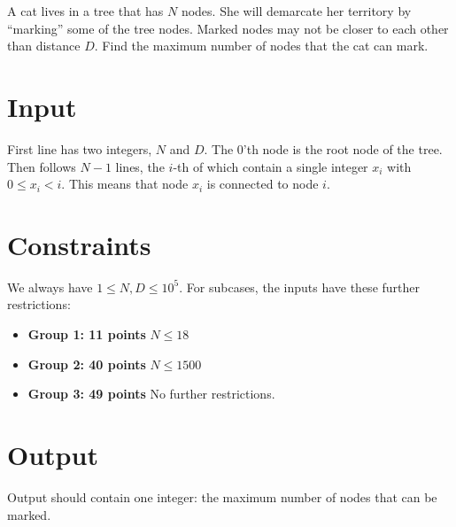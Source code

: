 
A cat lives in a tree that has $N$ nodes. She will demarcate her territory by ``marking'' some of the tree nodes. Marked nodes may not be closer to each other than distance $D$. Find the maximum number of nodes that the cat can mark.
 
\section*{Input}
First line has two integers, $N$ and $D$. The $0$'th node is the root node of the tree. Then follows $N-1$ lines, the $i$-th of which contain a single integer $x_i$ with $0 \leq x_i < i$. This means that node $x_i$ is connected to node $i$.
 


\section*{Constraints}
We always have $1 \leq N, D \leq 10^5$. For subcases, the inputs have these further restrictions:
\begin{itemize}
    \item{\textbf{Group 1: 11 points}} $N \leq 18$
    \item{\textbf{Group 2: 40 points}} $N \leq 1500$
    \item{\textbf{Group 3: 49 points}} No further restrictions.
\end{itemize}

\section*{Output}
Output should contain one integer: the maximum number of nodes that can be marked.

